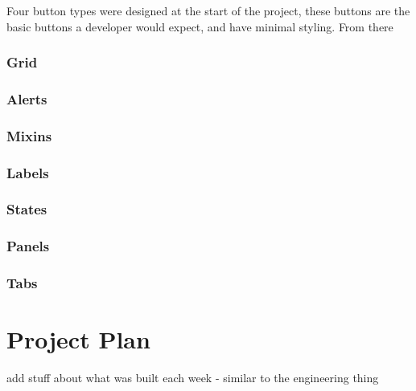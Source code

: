 Four button types were designed at the start of the project, these buttons are the basic buttons a developer would expect, and have minimal styling. From there 

\subsection{Grid}
\subsection{Alerts}
\subsection{Mixins}
\subsection{Labels}
\subsection{States}
\subsection{Panels}
\subsection{Tabs}

\newpage
\chapter*{Project Plan}
add stuff about what was built each week - similar to the engineering thing 